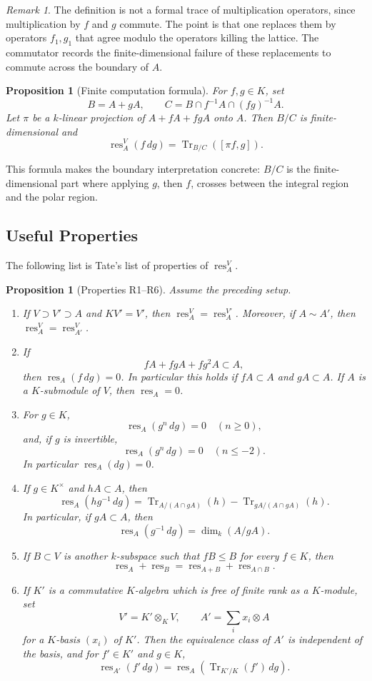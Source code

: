 \documentclass[11pt,a4paper]{article}
\newcommand{\res}{\operatorname{res}}
\newcommand{\Tr}{\operatorname{Tr}}
\theoremstyle{definition}
\theoremstyle{plain}
\newtheorem{proposition}[definition]{Proposition}
\theoremstyle{remark}
\newtheorem*{remark}{Remark}
\begin{document}
\begin{remark}
The definition is not a formal trace of multiplication operators, since multiplication by $f$ and $g$ commute.  The point is that one replaces them by operators $f_1,g_1$ that agree modulo the operators killing the lattice.  The commutator records the finite-dimensional failure of these replacements to commute across the boundary of $A$.
\end{remark}

\begin{proposition}[Finite computation formula]
For $f,g\in K$, set
\[
  B=A+gA,
  \qquad
  C=B\cap f^{-1}A\cap (fg)^{-1}A.
\]
Let $\pi$ be a $k$-linear projection of $A+fA+fgA$ onto $A$.  Then $B/C$ is finite-dimensional and
\[
  \res_A^V(f\,dg)=\Tr_{B/C}([\pi f,g]).
\]
\end{proposition}

This formula makes the boundary interpretation concrete: $B/C$ is the finite-dimensional part where applying $g$, then $f$, crosses between the integral region and the polar region.

\subsection{Useful Properties}

The following list is Tate's list of properties of $\res_A^V$.

\begin{proposition}[Properties R1--R6]
Assume the preceding setup.
\begin{enumerate}[label=(R\arabic*)]
\item If $V\supset V'\supset A$ and $KV'=V'$, then $\res_A^V=\res_A^{V'}$.  Moreover, if $A\sim A'$, then $\res_A^V=\res_{A'}^V$.
\item If
\[
  fA+fgA+fg^2A\subset A,
\]
then $\res_A(f\,dg)=0$.  In particular this holds if $fA\subset A$ and $gA\subset A$.  If $A$ is a $K$-submodule of $V$, then $\res_A=0$.
\item For $g\in K$,
\[
  \res_A(g^n\,dg)=0\quad(n\ge 0),
\]
and, if $g$ is invertible,
\[
  \res_A(g^n\,dg)=0\quad(n\le -2).
\]
In particular $\res_A(dg)=0$.
\item If $g\in K^\times$ and $hA\subset A$, then
\[
  \res_A(hg^{-1}\,dg)
  =\Tr_{A/(A\cap gA)}(h)-\Tr_{gA/(A\cap gA)}(h).
\]
In particular, if $gA\subset A$, then
\[
  \res_A(g^{-1}\,dg)=\dim_k(A/gA).
\]
\item If $B\subset V$ is another $k$-subspace such that $fB\le B$ for every $f\in K$, then
\[
  \res_A+\res_B=\res_{A+B}+\res_{A\cap B}.
\]
\item If $K'$ is a commutative $K$-algebra which is free of finite rank as a $K$-module, set
\[
  V'=K'\otimes_K V,
  \qquad
  A'=\sum_i x_i\otimes A
\]
for a $K$-basis $(x_i)$ of $K'$.  Then the equivalence class of $A'$ is independent of the basis, and for $f'\in K'$ and $g\in K$,
\[
  \res_{A'}(f'\,dg)=\res_A(\Tr_{K'/K}(f')\,dg).
\]
\end{enumerate}
\end{proposition}
\end{document}
